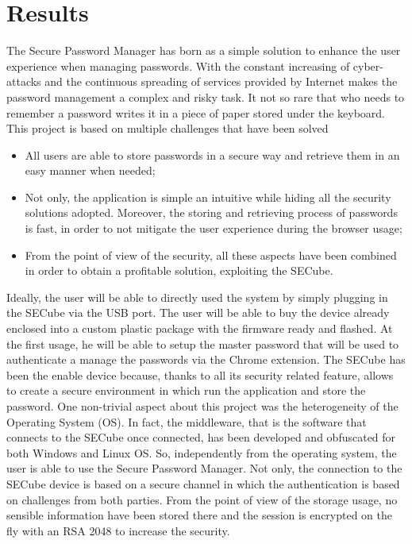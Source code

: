\chapter{Results}
\label{sec:results}

The Secure Password Manager has born as a simple solution to enhance the user experience when managing passwords. With the constant increasing of cyber-attacks and the continuous spreading of services provided by Internet makes the password management a complex and risky task. It not so rare that who needs to remember a password writes it in a piece of paper stored under the keyboard.\newline\newline
This project is based on multiple challenges that have been solved
\begin{itemize}
	\item All users are able to store passwords in a secure way and retrieve them in an easy manner when needed;
	\item Not only, the application is simple an intuitive while hiding all the security solutions adopted. Moreover, the storing and retrieving process of passwords is fast, in order to not mitigate the user experience during the browser usage;
	\item From the point of view of the security, all these aspects have been combined in order to obtain a profitable solution, exploiting the SECube.
\end{itemize}

Ideally, the user will be able to directly used the system by simply plugging in the SECube via the USB port. The user will be able to buy the device already enclosed into a custom plastic package with the firmware ready and flashed. At the first usage, he will be able to setup the master password that will be used to authenticate a manage the passwords via the Chrome extension. The SECube has been the enable device because, thanks to all its security related feature, allows to create a secure environment in which run the application and store the password.\newline\newline
One non-trivial aspect about this project was the heterogeneity of the Operating System (OS). In fact, the middleware, that is the software that connects to the SECube once connected, has been developed and obfuscated for both Windows and Linux OS. So, independently from the operating system, the user is able to use the Secure Password Manager. Not only, the connection to the SECube device is based on a secure channel in which the authentication is based on challenges from both parties. From the point of view of the storage usage, no sensible information have been stored there and the session is encrypted on the fly with an RSA 2048 to increase the security. 


